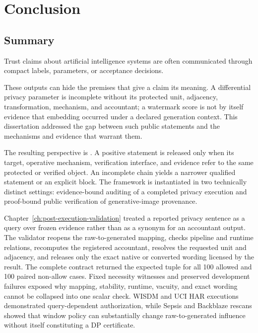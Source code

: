 \chapter{Conclusion}
\label{ch:conclusion}

\section{Summary}
\label{sec:ch5-summary}

Trust claims about artificial intelligence systems are often communicated through
compact labels, parameters, or acceptance decisions.

These outputs can hide the premises that give a claim its meaning.  A differential privacy parameter is
incomplete without its protected unit, adjacency, transformation, mechanism, and
accountant; a watermark score is not by itself evidence that embedding occurred
under a declared generation context.  This dissertation addressed the gap between
such public statements and the mechanisms and evidence that warrant them.

The resulting perspective is \ClaimAlignedAssurance{}.  A positive statement is
released only when its target, operative mechanism, verification interface, and
evidence refer to the same protected or verified object.  An incomplete chain
yields a narrower qualified statement or an explicit block.  The framework is
instantiated in two technically distinct settings: evidence-bound auditing of a
completed privacy execution and proof-bound public verification of generative-image
provenance.

Chapter~\ref{ch:post-execution-validation} treated a reported privacy sentence as
a query over frozen evidence rather than as a synonym for an accountant output.
The validator reopens the raw-to-generated mapping, checks pipeline and runtime
relations, recomputes the registered accountant, resolves the requested unit and
adjacency, and releases only the exact native or converted wording licensed by the
result.  The complete contract returned the expected tuple for all 100 allowed and
100 paired non-allow cases.  Fixed necessity witnesses and preserved development
failures exposed why mapping, stability, runtime, vacuity, and exact wording cannot
be collapsed into one scalar check.  WISDM and UCI HAR executions demonstrated
query-dependent authorization, while Sepsis and Backblaze rescans showed that
window policy can substantially change raw-to-generated influence without itself
constituting a DP certificate.

